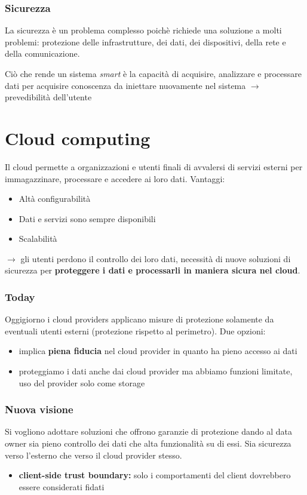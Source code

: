 \documentclass{report}
\begin{document}
\subsubsection{Sicurezza}
La sicurezza è un problema complesso poichè richiede una soluzione a molti problemi: 
protezione delle infrastrutture, dei dati, dei dispositivi, della rete e della comunicazione.

Ciò che rende un sistema \textit{smart} è la capacità di acquisire, analizzare e processare dati per acquisire conoscenza 
da iniettare nuovamente nel sistema $ \rightarrow $ prevedibilità dell'utente

\section{Cloud computing}
Il cloud permette a organizzazioni e utenti finali di avvalersi di servizi esterni per 
immagazzinare, processare e accedere ai loro dati.
Vantaggi:
\begin{itemize}
    \item Altà configurabilità
    \item Dati e servizi sono sempre disponibili
    \item Scalabilità
\end{itemize}

$ \rightarrow $ gli utenti perdono il controllo dei loro dati, necessità di nuove soluzioni di sicurezza per \textbf{proteggere i dati e 
processarli in maniera sicura nel cloud}.

\subsubsection{Today}
Oggigiorno i cloud providers applicano misure di protezione solamente da eventuali utenti esterni (protezione rispetto al perimetro).
Due opzioni:
\begin{itemize}
    \item implica \textbf{piena fiducia} nel cloud provider in quanto ha pieno accesso ai dati
    \item proteggiamo i dati anche dai cloud provider ma abbiamo funzioni limitate, uso del provider solo come storage
\end{itemize}

\subsubsection{Nuova visione}
Si vogliono adottare soluzioni che offrono garanzie di protezione dando al data owner sia pieno controllo dei dati che alta funzionalità su di essi.
Sia sicurezza verso l'esterno che verso il cloud provider stesso.
\begin{itemize}
    \item \textbf{client-side trust boundary:} solo i comportamenti del client dovrebbero essere considerati fidati
\end{itemize}
\end{document}

